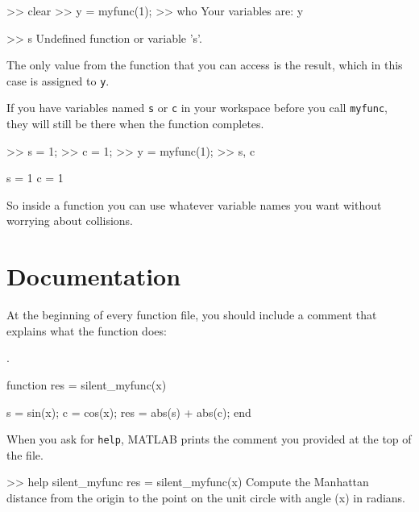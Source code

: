\documentclass[
]{book}
\numberwithin{Answer}{chapter}
\numberwithin{Exercise}{chapter}
\begin{document}
\begin{code}
>> clear
>> y = myfunc(1);
>> who
Your variables are: y

>> s
Undefined function or variable 's'.
\end{code}

The only value from the function that you can access is the result,
which in this case is assigned to {\tt y}.

If you have variables named {\tt s} or {\tt c} in your workspace
before you call {\tt myfunc}, they will still be there when the
function completes.

\begin{code}
>> s = 1;
>> c = 1;
>> y = myfunc(1);
>> s, c

s = 1
c = 1
\end{code}

So inside a function you can use whatever variable names you
want without worrying about collisions.



\section{Documentation}


At the beginning of every function file, you should include a comment
that explains what the function does:

.

\begin{code}

function res = silent_myfunc(x)

    s = sin(x);
    c = cos(x);
    res = abs(s) + abs(c);
end
\end{code}

When you ask for {\tt help}, MATLAB prints the comment you provided at the top of the file.


\begin{code}
>> help silent_myfunc
  res = silent_myfunc(x)
  Compute the Manhattan distance from the origin to the
  point on the unit circle with angle (x) in radians.
\end{code}
\end{document}
